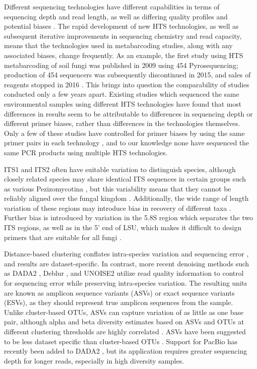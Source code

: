 \documentclass[
  12pt,
]{article}
\begin{document}
Different sequencing technologies have different capabilities in terms of sequencing depth and read length, as well as differing quality profiles and potential biases \autocite{yang2013}.
The rapid development of new HTS technologies, as well as subsequent iterative improvements in sequencing chemistry and read capacity, means that the technologies used in metabarcoding studies, along with any associated biases, change frequently.
As an example, the first study using HTS metabarcoding of soil fungi was published in 2009 \autocite{buee2009} using 454 Pyrosequencing; production of 454 sequencers was subsequently discontinued in 2015, and sales of reagents stopped in 2016 \autocite{hollmer2013}.
This brings into question the comparability of studies conducted only a few years apart.
Existing studies which sequenced the same environmental samples using different HTS technologies \autocites[e.g.,][]{claesson2010,smith2014,divoll2018,Kennedy2018,speranskaya2018,Tedersoo2018} have found that most differences in results seem to be attributable to differences in sequencing depth or different primer biases, rather than differences in the technologies themselves.
Only a few of these studies have controlled for primer biases by using the same primer pairs in each technology \autocite{claesson2010,divoll2018,speranskaya2018}, and to our knowledge none have sequenced the same PCR products using multiple HTS technologies.

ITS1 and ITS2 often have suitable variation to distinguish species, although closely related species may share identical ITS sequences in certain groups such as various Pezizomycotina \autocite{schoch2012},
but this variability means that they cannot be reliably aligned over the fungal kingdom \autocite{Lindahl2013,Tedersoo2018}.
Additionally, the wide range of length variation of these regions may introduce bias in recovery of different taxa \autocite{ihrmark2012,tedersoo2015,palmer2018}.
Further bias is introduced by variation in the 5.8S region which separates the two ITS regions, as well as in the 5' end of LSU, which makes it difficult to design primers that are suitable for all fungi \autocite{tedersoo2015}.

Distance-based clustering conflates intra-species variation and sequencing error \autocite{nilsson2008,lindner2011}, and results are dataset-specific.
In contrast, more recent denoising methods such as DADA2 \autocite{callahan2017}, Deblur \autocite{amir2017}, and UNOISE2 \autocite{edgar2016} utilize read quality information to control for sequencing error while preserving intra-species variation.
The resulting units are known as amplicon sequence variants (ASVs) or exact sequence variants (ESVs), as they should represent true amplicon sequences from the sample.
Unlike cluster-based OTUs, ASVs can capture variation of as little as one base pair, although alpha and beta diversity estimates based on ASVs and OTUs at different clustering thresholds are highly correlated \autocite{glassman2018,botnen2018}.
ASVs have been suggested to be less dataset specific than cluster-based OTUs \autocite{callahan2017}.
Support for PacBio has recently been added to DADA2 \autocite{callahan2019}, but its application requires greater sequencing depth for longer reads, especially in high diversity samples.
\end{document}
